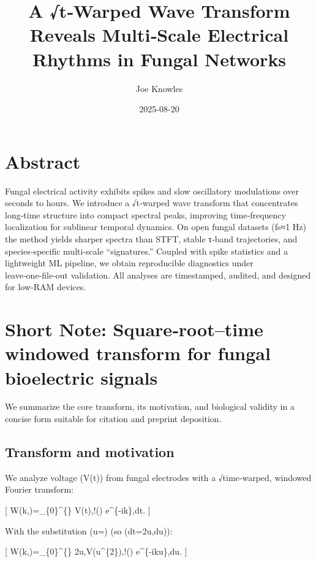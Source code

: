 \documentclass[
  11pt,
]{article}
\title{A √t‑Warped Wave Transform Reveals Multi‑Scale Electrical Rhythms
in Fungal Networks}
\author{Joe Knowles}
\date{2025-08-20}
\begin{document}
\maketitle

\hypertarget{abstract}{%
\section{Abstract}\label{abstract}}

Fungal electrical activity exhibits spikes and slow oscillatory
modulations over seconds to hours. We introduce a √t‑warped wave
transform that concentrates long‑time structure into compact spectral
peaks, improving time‑frequency localization for sublinear temporal
dynamics. On open fungal datasets (fs≈1 Hz) the method yields sharper
spectra than STFT, stable τ‑band trajectories, and species‑specific
multi‑scale ``signatures.'' Coupled with spike statistics and a
lightweight ML pipeline, we obtain reproducible diagnostics under
leave‑one‑file‑out validation. All analyses are timestamped, audited,
and designed for low‑RAM devices.

\hypertarget{short-note-squareroottime-windowed-transform-for-fungal-bioelectric-signals}{%
\section{Short Note: Square‑root--time windowed transform for fungal
bioelectric
signals}\label{short-note-squareroottime-windowed-transform-for-fungal-bioelectric-signals}}

We summarize the core transform, its motivation, and biological validity
in a concise form suitable for citation and preprint deposition.

\hypertarget{transform-and-motivation}{%
\subsection{Transform and motivation}\label{transform-and-motivation}}

We analyze voltage (V(t)) from fungal electrodes with a √time‑warped,
windowed Fourier transform:

{[} W(k,\tau)=\int\_\{0\}\^{}\{\infty\}
V(t),\psi!\left(\right) e\^{}\{-ik\},dt.
{]}

With the substitution (u=) (so (dt=2u,du)):

{[} W(k,\tau)=\int\_\{0\}\^{}\{\infty\}
2u,V(u\^{}\{2\}),\psi!\left(\right) e\^{}\{-iku\},du. {]}
\end{document}
